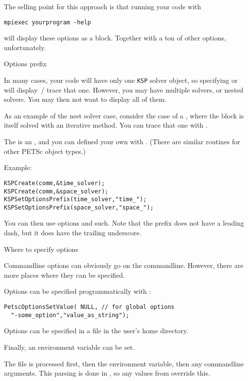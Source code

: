 The selling point for this approach is that running your code with
\begin{verbatim}
mpiexec yourprogram -help
\end{verbatim}
will display these options as a block.
Together with a ton of other options, unfortunately.

 {Options prefix}

In many cases, your code will have only one \lstinline{KSP} solver object,
so specifying  or  will display~/ trace that one.
However, you may have multiple solvers, or nested solvers. You may then
not want to display all of them.

As an example of the nest solver case, consider the case of a
, where the block is itself solved
with an iterative method. You can trace that one with
.

The  is an , and you can defined
your own with 
.
(There are similar routines for other PETSc object types.)

Example:
\begin{lstlisting}
KSPCreate(comm,&time_solver);
KSPCreate(comm,&space_solver);
KSPSetOptionsPrefix(time_solver,"time_");
KSPSetOptionsPrefix(space_solver,"space_");
\end{lstlisting}
You can then use options  and such.
Note that the prefix does not have a leading dash,
but it does have the trailing underscore.

 {Where to specify options}

Commandline options can obviously go on the commandline. However, there are more
places where they can be specified.

Options can be specified programmatically with
:
\begin{lstlisting}
PetscOptionsSetValue( NULL, // for global options
  "-some_option","value_as_string");
\end{lstlisting}

Options can be specified in a file  in the user's home directory.

Finally, an environment variable  can be set.

The  file is processed first, then the environment variable,
then any commandline arguments. This parsing is done in ,
so any values from  override this.

